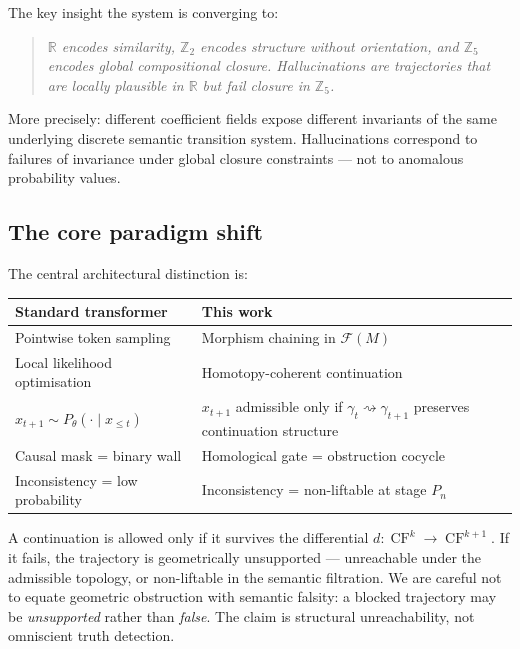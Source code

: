 \documentclass[11pt,a4paper]{article}
\DeclareMathOperator{\CF}{CF}
\newcommand{\Fuk}{\mathcal{F}}
\begin{document}
The key insight the system is converging to:

\begin{quote}
\emph{$\mathbb{R}$ encodes similarity, $\mathbb{Z}_2$ encodes structure
without orientation, and $\mathbb{Z}_5$ encodes global compositional
closure. Hallucinations are trajectories that are locally plausible in
$\mathbb{R}$ but fail closure in $\mathbb{Z}_5$.}
\end{quote}

More precisely: different coefficient fields expose different invariants
of the same underlying discrete semantic transition system.
Hallucinations correspond to failures of invariance under global
closure constraints --- not to anomalous probability values.

\subsection{The core paradigm shift}

The central architectural distinction is:

\begin{center}
\renewcommand{\arraystretch}{1.4}
\begin{tabular}{p{5cm}p{6.5cm}}
\toprule
\textbf{Standard transformer} & \textbf{This work} \\
\midrule
Pointwise token sampling & Morphism chaining in $\Fuk(M)$ \\
Local likelihood optimisation & Homotopy-coherent continuation \\
$x_{t+1} \sim P_\theta(\cdot \mid x_{\leq t})$ &
  $x_{t+1}$ admissible only if $\gamma_t \rightsquigarrow \gamma_{t+1}$
  preserves continuation structure \\
Causal mask = binary wall & Homological gate = obstruction cocycle \\
Inconsistency = low probability & Inconsistency = non-liftable at stage $P_n$ \\
\bottomrule
\end{tabular}
\end{center}

\noindent
A continuation is allowed only if it survives the differential
$d: \CF^k \to \CF^{k+1}$.
If it fails, the trajectory is geometrically unsupported ---
unreachable under the admissible topology, or non-liftable in the
semantic filtration.
We are careful not to equate geometric obstruction with semantic
falsity: a blocked trajectory may be \emph{unsupported} rather than
\emph{false}. The claim is structural unreachability, not
omniscient truth detection.
\end{document}
